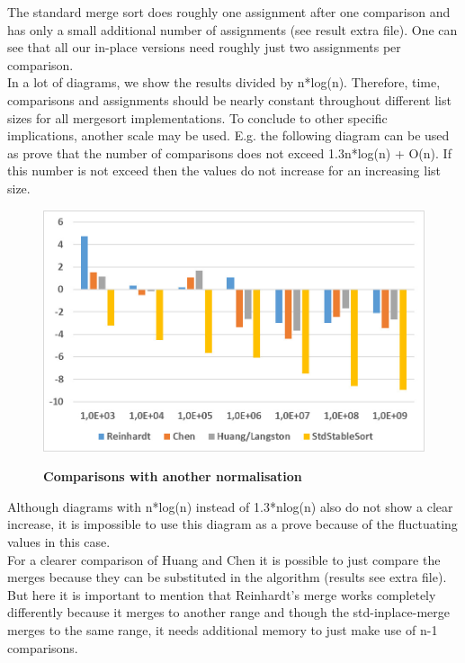 \documentclass[11pt,pdftex,a4paper, twocolumn]{article}
\begin{document}
The standard merge sort does roughly one assignment after one comparison and has only a small additional number of assignments (see result extra file). One can see that all our in-place versions need roughly just two assignments per comparison. \\
In a lot of diagrams, we show the results divided by n*log(n). Therefore, time, comparisons and assignments should be nearly constant throughout different list sizes for all mergesort implementations. To conclude to other specific implications, another scale may be used. E.g. the following diagram can be used as prove that the number of comparisons does not exceed 1.3n*log(n) + O(n). If this number is not exceed then the values do not increase for an increasing list size. \\
\begin{figure}[H]
\includegraphics[width=\linewidth]{Diagramm-Bilder/ints-time-otherNormalization.JPG} \\
\caption{\textbf{Comparisons with another normalisation}} \label{fig:ints-time-otherNormalization}
\end{figure}
Although diagrams with n*log(n) instead of 1.3*nlog(n) also do not show a clear increase, it is impossible to use this diagram as a prove because of the fluctuating values in this case. \\
For a clearer comparison of Huang and Chen it is possible to just compare the merges because they can be substituted in the algorithm (results see extra file). But here it is important to mention that Reinhardt’s merge works completely differently because it merges to another range and though the std-inplace-merge merges to the same range, it needs additional memory to just make use of n-1 comparisons. \\
\end{document}
